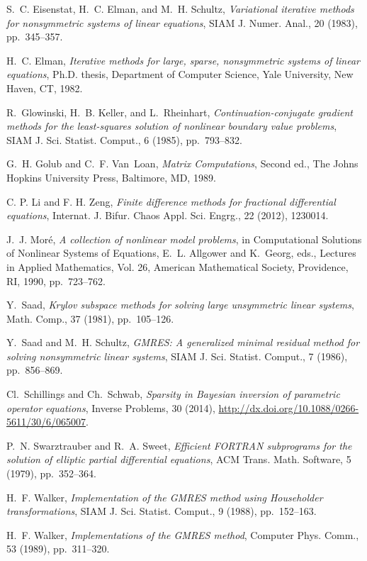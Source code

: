 \documentclass[final,leqno,onetabnum]{siamltex0315}
\begin{document}
\begin{thebibliography}{10}
{\sc S.~C. Eisenstat, H.~C. Elman, and M.~H. Schultz}, {\em Variational
  iterative methods for nonsymmetric systems of linear equations}, SIAM J.
  Numer. Anal., 20 (1983), pp.~345--357.

{\sc H.~C. Elman}, {\em Iterative methods for large, sparse, nonsymmetric
  systems of linear equations}, Ph.D. thesis, Department of Computer
  Science, Yale University, New Haven, CT, 1982.

{\sc R.~Glowinski, H.~B. Keller, and L.~Rheinhart}, {\em Continuation-conjugate
  gradient methods for the least-squares solution of nonlinear boundary value
  problems}, SIAM J. Sci. Statist. Comput., 6 (1985), pp.~793--832.

{\sc G.~H. Golub and C.~F. Van~Loan}, {\em Matrix Computations}, 
  Second ed., The Johns  Hopkins University Press, Baltimore, MD,  1989.
  
{\sc C. P. Li and F. H. Zeng,}  {\em Finite difference methods for
fractional differential equations}, {Internat. J. Bifur.
Chaos Appl. Sci. Engrg.}, {22} (2012), 1230014.  

{\sc J.~J. Mor\'e}, {\em A collection of nonlinear model problems}, in
  Computational Solutions of Nonlinear Systems of Equations, E.~L. Allgower and
  K.~Georg, eds., Lectures in Applied Mathematics, Vol. 26, American
  Mathematical Society, Providence, RI, 1990, pp.~723--762.

{\sc Y.~Saad}, {\em Krylov subspace methods for solving large unsymmetric
  linear systems}, Math. Comp., 37 (1981), pp.~105--126.

{\sc Y.~Saad and M.~H. Schultz}, {\em {\rm GMRES}: A generalized minimal
  residual method for solving nonsymmetric linear systems}, SIAM J. Sci. Statist.
  Comput., 7 (1986), pp.~856--869.

{\sc Cl.~Schillings and Ch.~Schwab}, {\em Sparsity in Bayesian inversion of parametric operator equations},
 Inverse Problems, 30 (2014), \href{http://dx.doi.org/10.1088/0266-5611/30/6/065007}{http://dx.doi.org/10.1088/0266-5611/30/6/065007}.

{\sc P.~N. Swarztrauber and R.~A. Sweet}, {\em Efficient {\rm FORTRAN}
  subprograms for the solution of elliptic partial differential equations}, ACM
  Trans. Math. Software, 5 (1979), pp.~352--364.

{\sc H.~F. Walker}, {\em Implementation of the {\rm GMRES} method using
  {H}ouseholder transformations}, SIAM J. Sci. Statist. Comput., 9 (1988),
  pp.~152--163.

{\sc H.~F. Walker}, {\em Implementations of
  the {\rm GMRES} method}, Computer Phys. Comm., 53 (1989),  pp.~311--320.

\end{thebibliography} 
\end{document}

